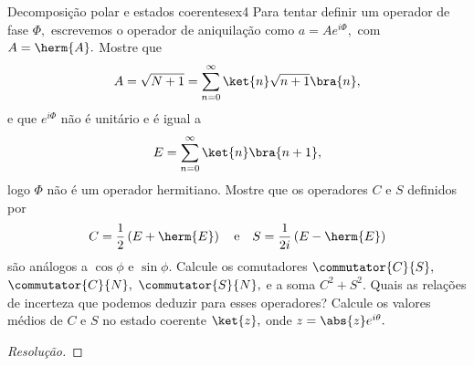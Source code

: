 \begin{exercício}{Decomposição polar e estados coerentes}{ex4}
   Para tentar definir um operador de fase \(\Phi,\) escrevemos o operador de aniquilação como \(a = A e^{i \Phi},\) com \(A = \herm{A}.\) Mostre que
   \begin{equation*}
      A = \sqrt{N + 1} = \sum_{n = 0}^{\infty} \ket{n} \sqrt{n+1} \bra{n},
   \end{equation*}
   e que \(e^{i \Phi}\) não é unitário e é igual a
   \begin{equation*}
      E = \sum_{n = 0}^\infty \ket{n}\bra{n+1},
   \end{equation*}
   logo \(\Phi\) não é um operador hermitiano. Mostre que os operadores \(C\) e \(S\) definidos por
   \begin{equation*}
      C = \frac{1}{2} \left(E + \herm{E}\right)
      \quad\text{e}\quad
      S = \frac1{2i} \left(E - \herm{E}\right)
   \end{equation*}
   são análogos a \(\cos\phi\) e \(\sin\phi.\) Calcule os comutadores \(\commutator{C}{S},\) \(\commutator{C}{N},\) \(\commutator{S}{N},\) e a soma \(C^2 + S^2.\) Quais as relações de incerteza que podemos deduzir para esses operadores? Calcule os valores médios de \(C\) e \(S\) no estado coerente \(\ket{z},\) onde \(z = \abs{z} e^{i\theta}.\)
\end{exercício}
\begin{proof}[Resolução]
    
\end{proof}
